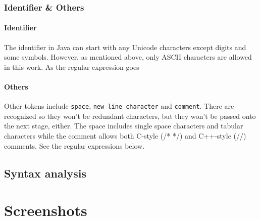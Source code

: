 \documentclass[12pt]{article}
\begin{document}
\subsubsection{Identifier \& Others}
\paragraph{Identifier}
The identifier in Java can start with any Unicode characters except digits and some symbols. However, as mentioned above, only ASCII characters are allowed in this work. As the regular expression goes


\paragraph{Others}
Other tokens include \texttt{space}, \texttt{new line character} and \texttt{comment}. There are recognized so they won't be redundant characters, but they won't be passed onto the next stage, either. The space includes single space characters and tabular characters while the comment allows both C-style (/* */) and C++-style (//) comments. See the regular expressions below.



\subsection{Syntax analysis}

\section{Screenshots}
\end{document}
